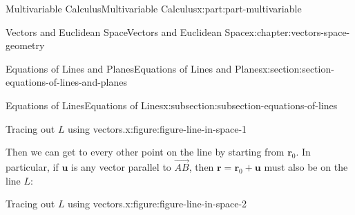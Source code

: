 \documentclass[twoside,10pt,]{book}
\numberwithin{equation}{part}
\begin{document}
\begin{partptx}{Multivariable Calculus}{}{Multivariable Calculus}{}{}{x:part:part-multivariable}
\begin{chapterptx}{Vectors and Euclidean Space}{}{Vectors and Euclidean Space}{}{}{x:chapter:vectors-space-geometry}
\begin{sectionptx}{Equations of Lines and Planes}{}{Equations of Lines and Planes}{}{}{x:section:section-equations-of-lines-and-planes}
\begin{subsectionptx}{Equations of Lines}{}{Equations of Lines}{}{}{x:subsection:subsection-equations-of-lines}
\begin{figureptx}{Tracing out \(L\) using vectors.}{x:figure:figure-line-in-space-1}{}
\begin{image}{0.05}{0.9}{0.05}
{
}%
\end{image}%
\tcblower
\end{figureptx}%
Then we can get to every other point on the line by starting from \(\mathbf{r}_{0}\). In particular, if \(\mathbf{u}\) is any vector parallel to \(\vec{AB}\), then \(\mathbf{r} = \mathbf{r}_{0}+\mathbf{u}\) must also be on the line \(L\):%
\begin{figureptx}{Tracing out \(L\) using vectors.}{x:figure:figure-line-in-space-2}{}%
\begin{image}{0.05}{0.9}{0.05}%
\end{image}
\end{figureptx}
\end{subsectionptx}
\end{sectionptx}
\end{chapterptx}
\end{partptx}
\end{document}
